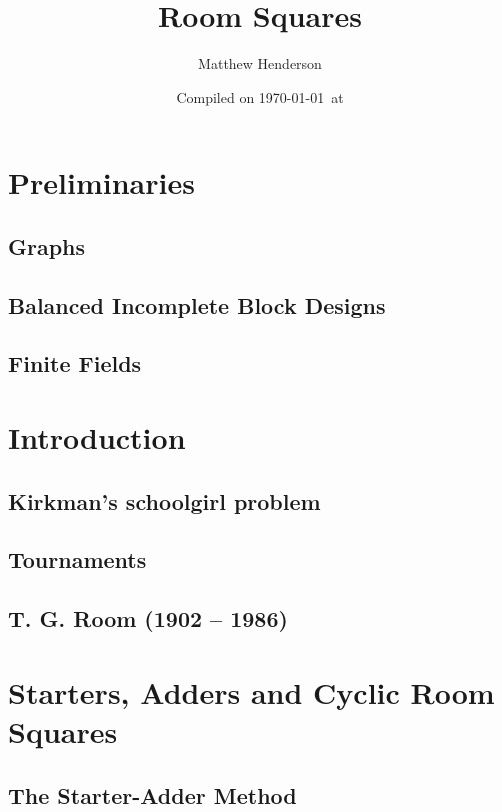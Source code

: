 \documentclass[a4paper, draft]{book}
\title{Room Squares}
\author{Matthew Henderson}
\date{Compiled on \today\ at \currenttime}
\begin{document}
\frontmatter
\maketitle
\tableofcontents

\mainmatter

\chapter{Preliminaries}
  \label{ch:preliminaries}
  \section{Graphs}
    \label{sec:graph}
    
  \section{Balanced Incomplete Block Designs}
    \label{sec:bibd}
    
  \section{Finite Fields}
    \label{sec:galois-field}
    

\chapter{Introduction}
  \label{ch:introduction}
  \section{Kirkman’s schoolgirl problem}
    
  \section{Tournaments}
    
  \section{T. G. Room (1902 -- 1986)}
    

\chapter{Starters, Adders and Cyclic Room Squares}
  \label{ch:starter-adder}
  \section{The Starter-Adder Method}
    
\end{document}
